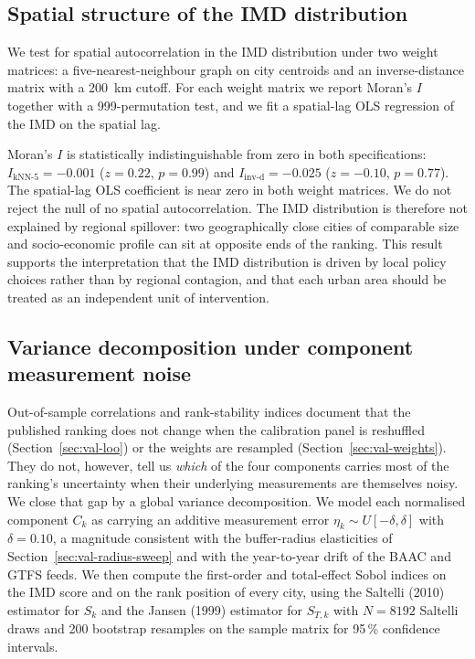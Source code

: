 \documentclass[11pt,a4paper]{article}
\begin{document}
\subsection{Spatial structure of the IMD distribution}
\label{sec:val-moran}

We test for spatial autocorrelation in the IMD distribution under
two weight matrices: a five-nearest-neighbour graph on city
centroids and an inverse-distance matrix with a 200~km cutoff.
For each weight matrix we report Moran's $I$ together with a
999-permutation test, and we fit a spatial-lag OLS regression of
the IMD on the spatial lag.

Moran's $I$ is statistically indistinguishable from zero in both
specifications: $I_{\text{kNN-5}} = -0.001$ ($z = 0.22$,
$p = 0.99$) and $I_{\text{inv-d}} = -0.025$ ($z = -0.10$,
$p = 0.77$). The spatial-lag OLS coefficient is near zero in both
weight matrices. We do not reject the null of no spatial
autocorrelation. The IMD distribution is therefore not explained
by regional spillover: two geographically close cities of
comparable size and socio-economic profile can sit at opposite
ends of the ranking. This result supports the interpretation that
the IMD distribution is driven by local policy choices rather
than by regional contagion, and that each urban area should be
treated as an independent unit of intervention.

\subsection{Variance decomposition under component measurement noise}
\label{sec:val-sobol}

Out-of-sample correlations and rank-stability indices document
that the published ranking does not change when the calibration
panel is reshuffled (Section~\ref{sec:val-loo}) or the weights are
resampled (Section~\ref{sec:val-weights}). They do not, however,
tell us \emph{which} of the four components carries most of the
ranking's uncertainty when their underlying measurements are
themselves noisy. We close that gap by a global variance
decomposition. We model each normalised component $C_k$ as carrying
an additive measurement error $\eta_k \sim U[-\delta, \delta]$ with
$\delta = 0.10$, a magnitude consistent with the buffer-radius
elasticities of Section~\ref{sec:val-radius-sweep} and with the
year-to-year drift of the BAAC and GTFS feeds. We then compute the
first-order and total-effect Sobol indices on the IMD score and on
the rank position of every city, using the Saltelli (2010)
estimator for $S_k$ and the Jansen (1999) estimator for $S_{T,k}$
with $N = 8192$ Saltelli draws and 200 bootstrap resamples on the
sample matrix for 95\,\% confidence intervals.
\end{document}
